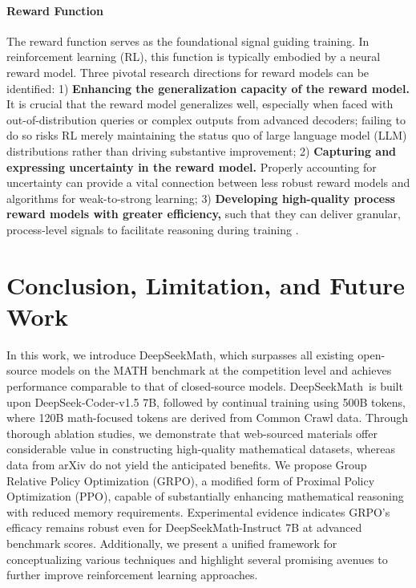 \begin{itemize}[topsep=0pt]
\begin{itemize}[topsep=0pt]
\paragraph{Reward Function} The reward function serves as the foundational signal guiding training. In reinforcement learning (RL), this function is typically embodied by a neural reward model. Three pivotal research directions for reward models can be identified: 1) \textbf{Enhancing the generalization capacity of the reward model.} It is crucial that the reward model generalizes well, especially when faced with out-of-distribution queries or complex outputs from advanced decoders; failing to do so risks RL merely maintaining the status quo of large language model (LLM) distributions rather than driving substantive improvement; 2) \textbf{Capturing and expressing uncertainty in the reward model.} Properly accounting for uncertainty can provide a vital connection between less robust reward models and algorithms for weak-to-strong learning; 3) \textbf{Developing high-quality process reward models with greater efficiency,} such that they can deliver granular, process-level signals to facilitate reasoning during training \citep{lightman2023let,wang2023math}.

\section{Conclusion, Limitation, and Future Work}

In this work, we introduce DeepSeekMath, which surpasses all existing open-source models on the MATH benchmark at the competition level and achieves performance comparable to that of closed-source models. DeepSeekMath~is built upon DeepSeek-Coder-v1.5 7B, followed by continual training using 500B tokens, where 120B math-focused tokens are derived from Common Crawl data. Through thorough ablation studies, we demonstrate that web-sourced materials offer considerable value in constructing high-quality mathematical datasets, whereas data from arXiv do not yield the anticipated benefits. We propose Group Relative Policy Optimization (GRPO), a modified form of Proximal Policy Optimization (PPO), capable of substantially enhancing mathematical reasoning with reduced memory requirements. Experimental evidence indicates GRPO's efficacy remains robust even for DeepSeekMath-Instruct 7B at advanced benchmark scores. Additionally, we present a unified framework for conceptualizing various techniques and highlight several promising avenues to further improve reinforcement learning approaches.


\end{itemize}
\end{itemize}
